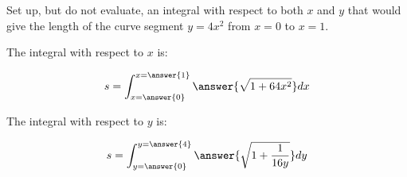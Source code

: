 \documentclass{ximera}
\author{Jim Talamo}
\begin{document}
\begin{exercise}

Set up, but do not evaluate, an integral with respect to both $x$ and $y$ that would give the length of the curve segment $y=4x^2$ from $x=0$ to $x=1$.

The integral with respect to $x$ is:

\[
s= \int_{x=\answer{0}}^{x=\answer{1}} \answer{\sqrt{1+64x^2}} dx
\]

The integral with respect to $y$ is:

\[
s= \int_{y=\answer{0}}^{y=\answer{4}} \answer{\sqrt{1+\frac{1}{16y}}} dy
\]
 

\end{exercise}
\end{document}
